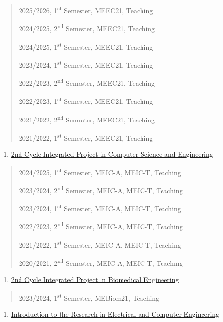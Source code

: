 \begin{quote}
2025/2026, 1\textsuperscript{st} Semester, MEEC21, Teaching

2024/2025, 2\textsuperscript{nd} Semester, MEEC21, Teaching

2024/2025, 1\textsuperscript{st} Semester, MEEC21, Teaching

2023/2024, 1\textsuperscript{st} Semester, MEEC21, Teaching

2022/2023, 2\textsuperscript{nd} Semester, MEEC21, Teaching

2022/2023, 1\textsuperscript{st} Semester, MEEC21, Teaching

2021/2022, 2\textsuperscript{nd} Semester, MEEC21, Teaching

2021/2022, 1\textsuperscript{st} Semester, MEEC21, Teaching
\end{quote}

\begin{enumerate}
\def\labelenumi{\arabic{enumi}.}
\setcounter{enumi}{22}
\item
  \ul{2nd Cycle Integrated Project in Computer Science and Engineering}
\end{enumerate}

\begin{quote}
2024/2025, 1\textsuperscript{st} Semester, MEIC-A, MEIC-T, Teaching

2023/2024, 2\textsuperscript{nd} Semester, MEIC-A, MEIC-T, Teaching

2023/2024, 1\textsuperscript{st} Semester, MEIC-A, MEIC-T, Teaching

2022/2023, 2\textsuperscript{nd} Semester, MEIC-A, MEIC-T, Teaching

2021/2022, 1\textsuperscript{st} Semester, MEIC-A, MEIC-T, Teaching

2020/2021, 2\textsuperscript{nd} Semester, MEIC-A, MEIC-T, Teaching
\end{quote}

\begin{enumerate}
\def\labelenumi{\arabic{enumi}.}
\setcounter{enumi}{23}
\item
  \ul{2nd Cycle Integrated Project in Biomedical Engineering}
\end{enumerate}

\begin{quote}
2023/2024, 1\textsuperscript{st} Semester, MEBiom21, Teaching
\end{quote}
\begin{enumerate}
\def\labelenumi{\arabic{enumi}.}
\setcounter{enumi}{24}
\item
  \ul{Introduction to the Research in Electrical and Computer
  Engineering}
\end{enumerate}

